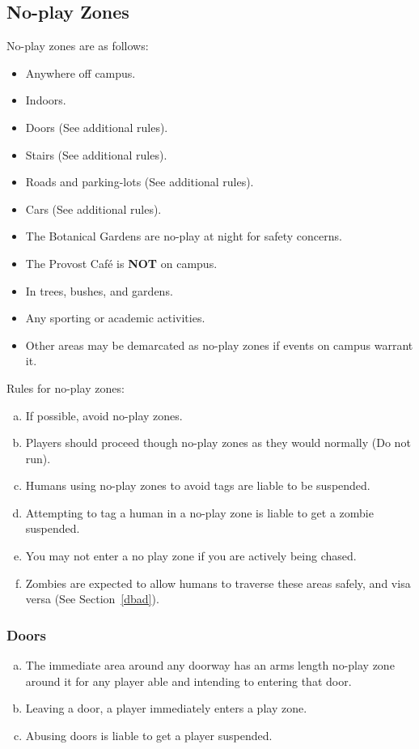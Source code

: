 \documentclass[a4paper,12pt]{article}
\begin{document}
\subsection{No-play Zones}
No-play zones are as follows:
\begin{itemize}
    \item Anywhere off campus.
    \item Indoors.
    \item Doors (See additional rules).
    \item Stairs (See additional rules).
    \item Roads and parking-lots (See additional rules).
    \item Cars (See additional rules).
    \item The Botanical Gardens are no-play at night for safety concerns.
    \item The Provost Caf\'e is {\bf NOT} on campus. 
    \item In trees, bushes, and gardens.
    \item Any sporting or academic activities.
    \item Other areas may be demarcated as no-play zones if events on campus warrant it.
\end{itemize}

Rules for no-play zones:
\begin{enumerate}[(a)]
    \item If possible, avoid no-play zones.
    \item Players should proceed though no-play zones as they would normally (Do not run).
    \item Humans using no-play zones to avoid tags are liable to be suspended.     
    \item Attempting to tag a human in a no-play zone is liable to get a zombie suspended.
    \item You may not enter a no play zone if you are actively being chased.
    \item Zombies are expected to allow humans to traverse these areas safely, and visa versa (See Section~\ref{dbad}).
\end{enumerate}

\subsubsection{Doors}
\begin{enumerate}[(a)]
    \item The immediate area around any doorway has an arms length no-play zone around it for any player able and intending to entering that door. 
    \item Leaving a door, a player immediately enters a play zone.
    \item Abusing doors is liable to get a player suspended.
\end{enumerate}
\end{document}
